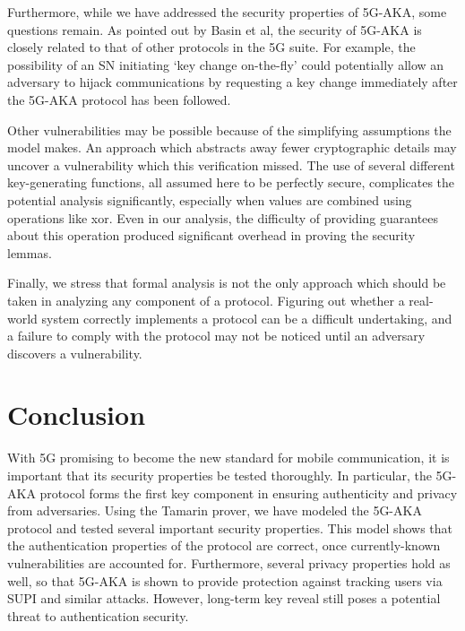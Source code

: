 \documentclass[10pt, pdftex]{article}
\begin{document}
Furthermore, while we have addressed the security properties of 5G-AKA, some questions remain. As pointed out by Basin et al,\cite{basin2018formal} the security of 5G-AKA is closely related to that of other protocols in the 5G suite. For example, the possibility of an SN initiating `key change on-the-fly' could potentially allow an adversary to hijack communications by requesting a key change immediately after the 5G-AKA protocol has been followed.

Other vulnerabilities may be possible because of the simplifying assumptions the model makes. An approach which abstracts away fewer cryptographic details may uncover a vulnerability which this verification missed. The use of several different key-generating functions, all assumed here to be perfectly secure, complicates the potential analysis significantly, especially when values are combined using operations like xor. Even in our analysis, the difficulty of providing guarantees about this operation produced significant overhead in proving the security lemmas.

Finally, we stress that formal analysis is not the only approach which should be taken in analyzing any component of a protocol. Figuring out whether a real-world system correctly implements a protocol can be a difficult undertaking, and a failure to comply with the protocol may not be noticed until an adversary discovers a vulnerability.

\section{Conclusion}

With 5G promising to become the new standard for mobile communication, it is important that its security properties be tested thoroughly. In particular, the 5G-AKA protocol forms the first key component in ensuring authenticity and privacy from adversaries. Using the Tamarin prover, we have modeled the 5G-AKA protocol and tested several important security properties. This model shows that the authentication properties of the protocol are correct, once currently-known vulnerabilities are accounted for. Furthermore, several privacy properties hold as well, so that 5G-AKA is shown to provide protection against tracking users via SUPI and similar attacks. However, long-term key reveal still poses a potential threat to authentication security.

\nocite{*}


\end{document}

